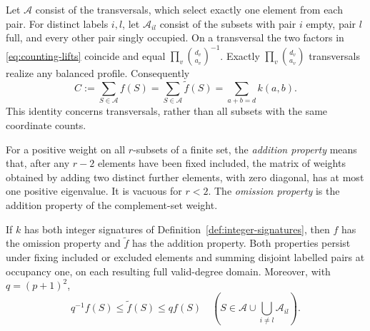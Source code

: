 Let $\mathcal A$ consist of the transversals, which select exactly one
element from each pair.  For distinct labels $i,l$, let $\mathcal A_{il}$
consist of the subsets with pair $i$ empty, pair $l$ full, and every
other pair singly occupied.  On a transversal the two factors in
\eqref{eq:counting-lifts} coincide and equal
$\prod_v\binom{d_v}{a_v}^{-1}$.  Exactly
$\prod_v\binom{d_v}{a_v}$ transversals realize any balanced profile.
Consequently
\begin{equation}
 C:=\sum_{S\in\mathcal A}f(S)
   =\sum_{S\in\mathcal A}\widetilde f(S)
   =\sum_{a+b=d}k(a,b).
 \label{eq:counting-multiplicity}
\end{equation}
This identity concerns transversals, rather than all subsets with the
same coordinate counts.

For a positive weight on all $r$-subsets of a finite set, the
\emph{addition property} means that, after any $r-2$ elements have
been fixed included, the matrix of weights obtained by adding two
distinct further elements, with zero diagonal, has at most one positive
eigenvalue.  It is vacuous for $r<2$.  The \emph{omission property} is
the addition property of the complement-set weight.

\begin{lemma}
\label{lem:counting-lifts}
If $k$ has both integer signatures of Definition~\ref{def:integer-signatures},
then $f$ has the omission property and $\widetilde f$ has the addition
property.  Both properties persist under fixing included or excluded
elements and summing disjoint labelled pairs at occupancy one, on each
resulting full valid-degree domain.  Moreover, with $q=(p+1)^2$,
\begin{equation}
 q^{-1}f(S)\leq\widetilde f(S)\leq qf(S)
 \quad\left(S\in\mathcal A\cup\bigcup_{i\ne l}\mathcal A_{il}\right).
 \label{eq:counting-comparison}
\end{equation}
\end{lemma}

